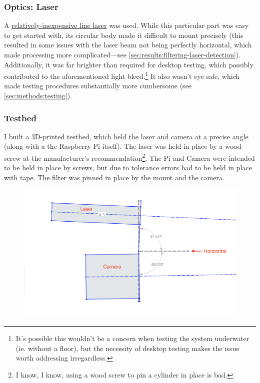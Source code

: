 \documentclass{article}
\begin{document}
\subsubsection{Optics: Laser} \label{sec:methods:hardware:optics-laser}

A \hyperlink{https://smile.amazon.com/Cutting-Locator-Positioning-18x75mm-Heatsink/dp/B07B9W6M6M}{relatively-inexpensive line laser} was used. While this particular part was easy to get started with, its circular body made it difficult to mount precisely (this resulted in some issues with the laser beam not being perfectly horizontal, which made processing more complicated---see \ref{sec:results:filtering-laser-detection}). Additionally, it was far brighter than required for desktop testing, which possibly contributed to the aforementioned light bleed.\footnote{It's possible this wouldn't be a concern when testing the system underwater (ie. without a floor), but the necessity of desktop testing makes the issue worth addressing irregardless.} It also wasn't eye safe, which made testing procedures substantially more cumbersome (see \ref{sec:methods:testing}).

\subsubsection{Testbed} \label{sec:methods:hardware:testbed}

I built a 3D-printed testbed, which held the laser and camera at a precise angle (along with a the Raspberry Pi itself). The laser was held in place by a wood screw at the manufacturer's recommendation\footnote{I know, I know, using a wood screw to pin a cylinder in place is bad.}. The Pi and Camera were intended to be held in place by screws, but due to tolerance errors had to be held in place with tape. The filter was pinned in place by the mount and the camera.

\begin{figure} [!h]

	\centering
    \includegraphics[width=0.8\linewidth]{laser-geometry.png}
	
	\caption{}
	
	\label{fig:testbed-geometry}
\end{figure}
\end{document}
